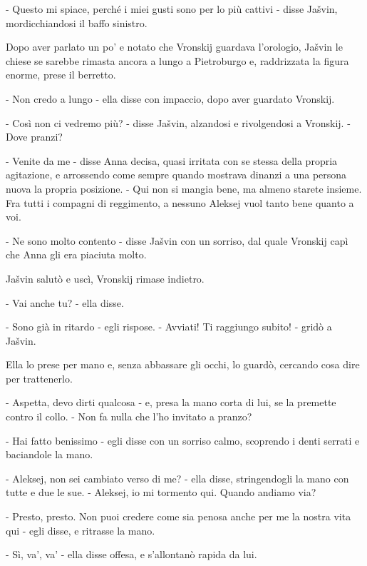 - Questo mi spiace, perché i miei gusti sono per lo più cattivi - disse Jašvin, mordicchiandosi il baffo sinistro. 

Dopo aver parlato un po' e notato che Vronskij guardava l'orologio, Jašvin le chiese se sarebbe rimasta ancora a lungo a Pietroburgo e, raddrizzata la figura enorme, prese il berretto. 

- Non credo a lungo - ella disse con impaccio, dopo aver guardato Vronskij. 

- Così non ci vedremo più? - disse Jašvin, alzandosi e rivolgendosi a Vronskij. - Dove pranzi? 

- Venite da me - disse Anna decisa, quasi irritata con se stessa della propria agitazione, e arrossendo come sempre quando mostrava dinanzi a una persona nuova la propria posizione. - Qui non si mangia bene, ma almeno starete insieme. Fra tutti i compagni di reggimento, a nessuno Aleksej vuol tanto bene quanto a voi. 

- Ne sono molto contento - disse Jašvin con un sorriso, dal quale Vronskij capì che Anna gli era piaciuta molto. 

Jašvin salutò e uscì, Vronskij rimase indietro. 

- Vai anche tu? - ella disse. 

- Sono già in ritardo - egli rispose. - Avviati! Ti raggiungo subito! - gridò a Jašvin. 

Ella lo prese per mano e, senza abbassare gli occhi, lo guardò, cercando cosa dire per trattenerlo. 

- Aspetta, devo dirti qualcosa - e, presa la mano corta di lui, se la premette contro il collo. - Non fa nulla che l'ho invitato a pranzo? 

- Hai fatto benissimo - egli disse con un sorriso calmo, scoprendo i denti serrati e baciandole la mano. 

- Aleksej, non sei cambiato verso di me? - ella disse, stringendogli la mano con tutte e due le sue. - Aleksej, io mi tormento qui. Quando andiamo via? 

- Presto, presto. Non puoi credere come sia penosa anche per me la nostra vita qui - egli disse, e ritrasse la mano. 

- Sì, va', va' - ella disse offesa, e s'allontanò rapida da lui. 

\label{xxxii-3} 

